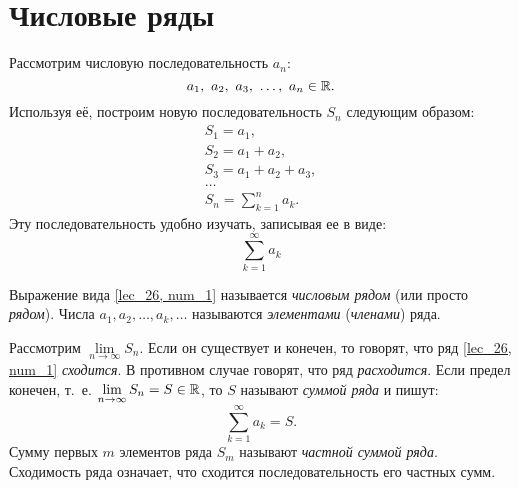 \documentclass[../../main.tex]{subfiles}
\begin{document}
\section{Числовые ряды}
Рассмотрим числовую последовательность $a_n$:
\[a_1,\  a_2,\  a_3,\  \ldots,\  a_n \in \mathbb{R}.\]
Используя её, построим новую
последовательность $S_n$ следующим образом:
\[
\begin{array}{l}
		S_1 = a_1, \\
		S_2 = a_1 + a_2,\\
		S_3 = a_1 + a_2 + a_3,\\
		\dots\\
		S_n = \sum\limits_{k = 1}^na_k.
\end{array}		
\]
Эту последовательность удобно изучать, записывая ее в виде:
\begin{equation}
	\label{lec_26, num_1}
	 \sum\limits_{k = 1}^\infty a_k
\end{equation}
\begin{definition}
Выражение вида \eqref{lec_26, num_1} называется
\emph{числовым рядом} (или просто \emph{рядом}).
Числа  $a_1, a_2,  \ldots, a_k,  \ldots$ 
называются \emph{элементами} (\emph{членами}) ряда.
\end{definition}

Рассмотрим $\lim\limits_{n \to \infty} S_n$. Если он существует 
и конечен, то говорят, 
что ряд \eqref{lec_26, num_1}  \emph{сходится}. 
В противном случае говорят, что ряд \emph{расходится}.
Если предел конечен, т.~е. 
$\lim\limits_{n \to \infty} S_n = S \in \mathbb{R}$, то $S$ 
называют \emph{суммой ряда} и пишут:
\[
	\sum\limits_{k = 1}^\infty a_k=S
.\]
Сумму первых $m$ элементов ряда 
$S_m$ называют \emph{частной суммой ряда}. 
Сходимость ряда означает,
что сходится последовательность его частных сумм.
\end{document}
